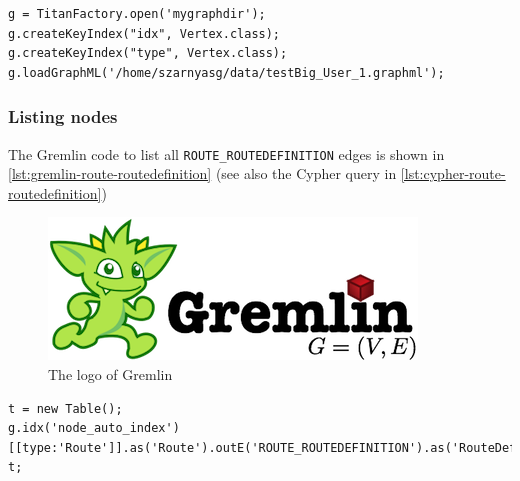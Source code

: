 \begin{lstlisting}[caption=Gremlin commands to initialize the a single-node Titan instance, label=lst:titan-singlenode, breaklines=true]
g = TitanFactory.open('mygraphdir');
g.createKeyIndex("idx", Vertex.class);
g.createKeyIndex("type", Vertex.class);
g.loadGraphML('/home/szarnyasg/data/testBig_User_1.graphml');
\end{lstlisting}

\subsubsection{Listing nodes}

The Gremlin code to list all \texttt{ROUTE\_ROUTEDEFINITION} edges is shown in \autoref{lst:gremlin-route-routedefinition} (see also the Cypher query in \autoref{lst:cypher-route-routedefinition})

\begin{figure}
\begin{center}
\includegraphics[]{figures/gremlin-logo}
\caption{The logo of Gremlin}
\label{fig:gremlin-logo}
\end{center}
\end{figure}

\begin{lstlisting}[caption=Gremlin query to retrieve all \texttt{ROUTE\_ROUTEDEFINITION} edges, label=lst:gremlin-route-routedefinition, breaklines=true]
t = new Table(); 
g.idx('node_auto_index')[[type:'Route']].as('Route').outE('ROUTE_ROUTEDEFINITION').as('RouteDefinition').inV.as('Sensor').table(t).iterate();
t;
\end{lstlisting}
